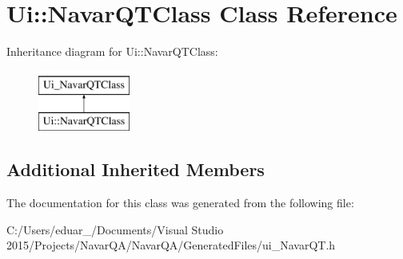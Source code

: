 \hypertarget{class_ui_1_1_navar_q_t_class}{}\section{Ui\+:\+:Navar\+Q\+T\+Class Class Reference}
\label{class_ui_1_1_navar_q_t_class}
Inheritance diagram for Ui\+:\+:Navar\+Q\+T\+Class\+:\begin{figure}[H]
\begin{center}
\leavevmode
\includegraphics[height=2.000000cm]{class_ui_1_1_navar_q_t_class}
\end{center}
\end{figure}
\subsection*{Additional Inherited Members}


The documentation for this class was generated from the following file\+:\begin{DoxyCompactItemize}
\item 
C\+:/\+Users/eduar\+\_/\+Documents/\+Visual Studio 2015/\+Projects/\+Navar\+Q\+A/\+Navar\+Q\+A/\+Generated\+Files/ui\+\_\+\+Navar\+Q\+T.\+h\end{DoxyCompactItemize}
